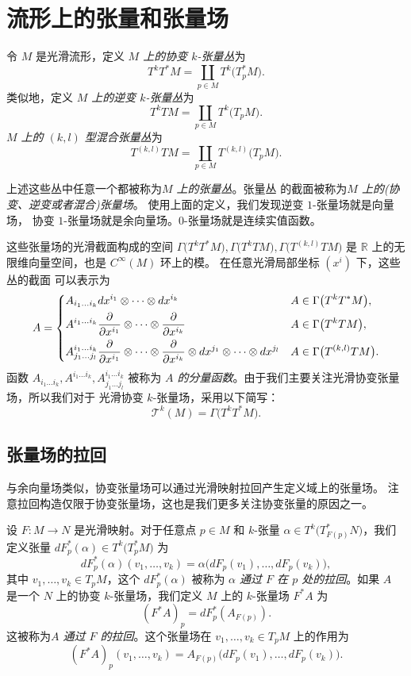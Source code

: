 \documentclass[fontset=none]{Notes}
\begin{document}
\section{流形上的张量和张量场}

令 $M$ 是光滑流形，定义 \emph{$M$ 上的协变 $k$-张量丛}为
\[
  T^kT^*M=\coprod_{p\in M}T^k\bigl(T_p^*M\bigr).  
\] 
类似地，定义 \emph{$M$ 上的逆变 $k$-张量丛}为
\[
  T^kTM=\coprod_{p\in M}T^k\bigl(T_pM\bigr)  .
\]
\emph{$M$ 上的 $(k,l)$ 型混合张量丛}为
\[
  T^{(k,l)}TM=\coprod_{p\in M}  T^{(k,l)}\bigl(T_pM\bigr).
\]

上述这些丛中任意一个都被称为\emph{$M$ 上的张量丛}。张量丛
的截面被称为\emph{$M$ 上的(协变、逆变或者混合)张量场}。
使用上面的定义，我们发现逆变 $1$-张量场就是向量场，
协变 $1$-张量场就是余向量场。$0$-张量场就是连续实值函数。

这些张量场的光滑截面构成的空间 
$\Gamma\bigl(T^kT^*M\bigr),\Gamma\bigl(T^kTM\bigr),\Gamma\bigl(T^{(k,l)}TM\bigr)$
是 $\mathbb{R}$ 上的无限维向量空间，也是 $C^\infty(M)$ 环上的模。
在任意光滑局部坐标 $\left(x^i\right)$ 下，这些丛的截面
可以表示为
\[
  A=\begin{dcases}
    A_{i_1\dots i_k}dx^{i_1}\otimes\cdots\otimes dx^{i_k} & A\in \Gamma\bigl(T^kT^*M\bigr),\\
    A^{i_1\dots i_k}\frac{\partial}{\partial x^{i_1}}\otimes
    \cdots\otimes \frac{\partial}{\partial x^{i_k}} & A\in \Gamma\bigl(T^kTM\bigr),\\
    A_{j_1\dots j_l}^{i_1\dots i_k}\frac{\partial}{\partial x^{i_1}}\otimes
    \cdots\otimes \frac{\partial}{\partial x^{i_k}}\otimes
    dx^{j_1}\otimes\cdots\otimes dx^{j_l} & A\in \Gamma\bigl(T^{(k,l)}TM\bigr).
  \end{dcases}  
\]
函数 $A_{i_1\dots i_k},A^{i_1\dots i_k},A_{j_1\dots j_l}^{i_1\dots i_k}$ 被称为
\emph{$A$ 的分量函数}。由于我们主要关注光滑协变张量场，所以我们对于
光滑协变 $k$-张量场，采用以下简写：
\[
  \mathcal{T}^k(M)=\Gamma\bigl(T^kT^*M\bigr)  .
\]

\subsection{张量场的拉回}

与余向量场类似，协变张量场可以通过光滑映射拉回产生定义域上的张量场。
注意拉回构造仅限于协变张量场，这也是我们更多关注协变张量的原因之一。

设 $F:M\to N$ 是光滑映射。对于任意点 $p\in M$ 和 $k$-张量
$\alpha\in T^k\bigl(T_{F(p)}^*N\bigr)$，我们定义张量
$dF_p^*(\alpha)\in T^k\bigl(T_p^*M\bigr)$ 为
\[
  dF_p^*(\alpha)(v_1,\dots,v_k)=\alpha\bigl(dF_p(v_1),\dots,dF_p(v_k)\bigr)  ,
\]
其中 $v_1,\dots,v_k\in T_pM$，这个 $dF_p^*(\alpha)$ 被称为
\emph{$\alpha$ 通过 $F$ 在 $p$ 处的拉回}。如果 $A$ 是一个
$N$ 上的协变 $k$-张量场，我们定义 $M$ 上的 $k$-张量场
$F^*A$ 为
\[
  (F^*A)  _p=dF_p^*(A_{F(p)}).
\]
这被称为\emph{$A$ 通过 $F$ 的拉回}。这个张量场在
$v_1,\dots,v_k\in T_pM$ 上的作用为
\[
  (F^*A)  _p(v_1,\dots,v_k)=A_{F(p)}\bigl(dF_p(v_1),\dots,dF_p(v_k)\bigr).
\]
\end{document}
